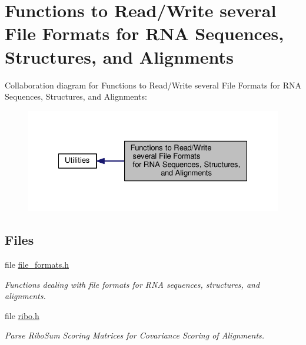 \hypertarget{group__file__utils}{\section{Functions to Read/\-Write several File Formats for R\-N\-A Sequences, Structures, and Alignments}
\label{group__file__utils}
}
Collaboration diagram for Functions to Read/\-Write several File Formats for R\-N\-A Sequences, Structures, and Alignments\-:
\nopagebreak
\begin{figure}[H]
\begin{center}
\leavevmode
\includegraphics[width=328pt]{group__file__utils}
\end{center}
\end{figure}
\subsection*{Files}
\begin{DoxyCompactItemize}
\item 
file \hyperlink{file__formats_8h}{file\-\_\-formats.\-h}
\begin{DoxyCompactList}\small\item\em Functions dealing with file formats for R\-N\-A sequences, structures, and alignments. \end{DoxyCompactList}\item 
file \hyperlink{ribo_8h}{ribo.\-h}
\begin{DoxyCompactList}\small\item\em Parse Ribo\-Sum Scoring Matrices for Covariance Scoring of Alignments. \end{DoxyCompactList}\end{DoxyCompactItemize}
